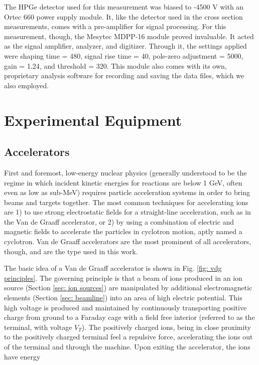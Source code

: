 The HPGe detector used for this measurement was biased to -4500 V with an Ortec 660 power supply module. It, like the detector used in the cross section measurements, comes with a pre-amplifier for signal processing. For this measurement, though, the Mesytec MDPP-16 module proved invaluable. It acted as the signal amplifier, analyzer, and digitizer. Through it, the settings applied were shaping time = 480, signal rise time = 40, pole-zero adjustment = 5000, gain = 1.24, and threshold = 320. This module also comes with its own, proprietary analysis software for recording and saving the data files, which we also employed.



\section{Experimental Equipment}
\label{sec: equipment}



\subsection{Accelerators}
\label{sec: accelerators}

First and foremost, low-energy nuclear physics (generally understood to be the regime in which incident kinetic energies for reactions are below 1 GeV, often even as low as sub-MeV) requires particle acceleration systems in order to bring beams and targets together. The most common techniques for accelerating ions are 1) to use strong electrostatic fields for a straight-line acceleration, such as in the Van de Graaff accelerator, or 2)  by using a combination of electric and magnetic fields to accelerate the particles in cyclotron motion, aptly named a cyclotron. Van de Graaff accelerators are the most prominent of all accelerators, though, and are the type used in this work. 

The basic idea of a Van de Graaff accelerator is shown in Fig. \ref{fig: vdg principles}. The governing principle is that a beam of ions produced in an ion source (Section \ref{sec: ion sources}) are manipulated by additional electromagnetic elements (Section \ref{sec: beamline}) into an area of high electric potential. This high voltage is produced and maintained by continuously transporting positive charge from ground to a Faraday cage with a field free interior (referred to as the terminal, with voltage $V_{T}$). The positively charged ions, being in close proximity to the positively charged terminal feel a repulsive force, accelerating the ions out of the terminal and through the machine. Upon exiting the accelerator, the ions have energy

